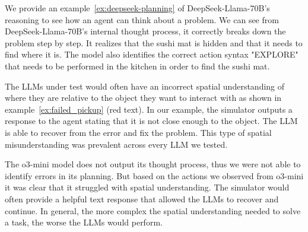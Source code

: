 We provide an example~\ref{ex:deepseek-planning} of DeepSeek-Llama-70B's reasoning to see how an agent can think about a problem.  We can see from DeepSeek-Llama-70B's internal thought process, it correctly breaks down the problem step by step.  It realizes that the sushi mat is hidden and that it needs to find where it is.  The model also identifies the correct action syntax "EXPLORE" that needs to be performed in the kitchen in order to find the sushi mat.

The LLMs under test would often have an incorrect spatial understanding of where they are relative to the object they want to interact with as shown in example~\ref{ex:failed_pickup} (red text).  In our example, the simulator outputs a response to the agent stating that it is not close enough to the object.  The LLM is able to recover from the error and fix the problem.  This type of spatial misunderstanding was prevalent across every LLM we tested.

The o3-mini model does not output its thought process, thus we were not able to identify errors in its planning.  But based on the actions we observed from o3-mini it was clear that it struggled with spatial understanding.  The simulator would often provide a helpful text response that allowed the LLMs to recover and continue.  In general, the more complex the spatial understanding needed to solve a task, the worse the LLMs would perform.


